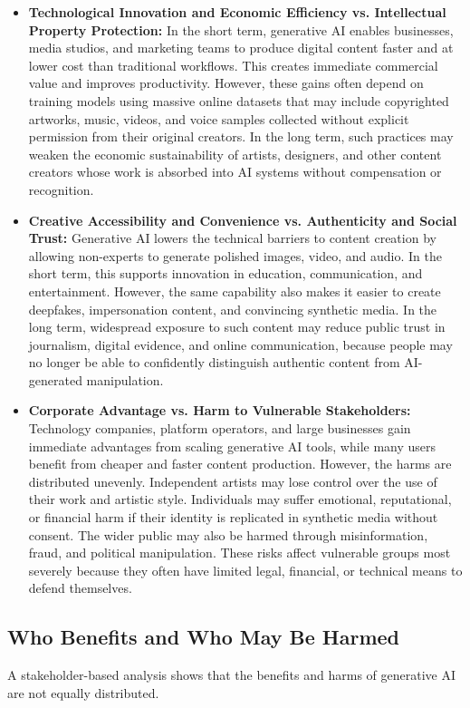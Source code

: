 \begin{itemize}
  \item \textbf{Technological Innovation and Economic Efficiency vs. Intellectual Property Protection:} In the short term, generative AI enables businesses, media studios, and marketing teams to produce digital content faster and at lower cost than traditional workflows. This creates immediate commercial value and improves productivity. However, these gains often depend on training models using massive online datasets that may include copyrighted artworks, music, videos, and voice samples collected without explicit permission from their original creators. In the long term, such practices may weaken the economic sustainability of artists, designers, and other content creators whose work is absorbed into AI systems without compensation or recognition.

  \item \textbf{Creative Accessibility and Convenience vs. Authenticity and Social Trust:} Generative AI lowers the technical barriers to content creation by allowing non-experts to generate polished images, video, and audio. In the short term, this supports innovation in education, communication, and entertainment. However, the same capability also makes it easier to create deepfakes, impersonation content, and convincing synthetic media. In the long term, widespread exposure to such content may reduce public trust in journalism, digital evidence, and online communication, because people may no longer be able to confidently distinguish authentic content from AI-generated manipulation.

  \item \textbf{Corporate Advantage vs. Harm to Vulnerable Stakeholders:} Technology companies, platform operators, and large businesses gain immediate advantages from scaling generative AI tools, while many users benefit from cheaper and faster content production. However, the harms are distributed unevenly. Independent artists may lose control over the use of their work and artistic style. Individuals may suffer emotional, reputational, or financial harm if their identity is replicated in synthetic media without consent. The wider public may also be harmed through misinformation, fraud, and political manipulation. These risks affect vulnerable groups most severely because they often have limited legal, financial, or technical means to defend themselves.
\end{itemize}

\subsection{Who Benefits and Who May Be Harmed}
A stakeholder-based analysis shows that the benefits and harms of generative AI are not equally distributed.

